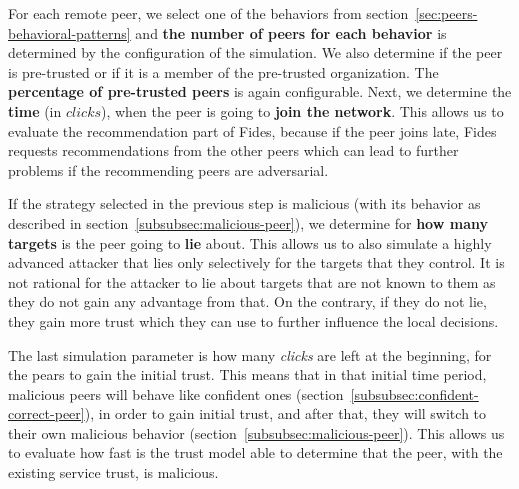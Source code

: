 For each remote peer, we select one of the behaviors from section~\ref{sec:peers-behavioral-patterns} and \textbf{the number of peers for each behavior} is determined by the configuration of the simulation.
We also determine if the peer is pre-trusted or if it is a member of the pre-trusted organization. The \textbf{percentage of pre-trusted peers} is again configurable.
Next, we determine the \textbf{time} (in $clicks$), when the peer is going to \textbf{join the network}. This allows us to evaluate the recommendation part of Fides, because if the peer joins late, Fides requests recommendations from the other peers which can lead to further problems if the recommending peers are adversarial.

If the strategy selected in the previous step is malicious (with its behavior as described in section~\ref{subsubsec:malicious-peer}), we determine for \textbf{how many targets} is the peer going to \textbf{lie} about.
This allows us to also simulate a highly advanced attacker that lies only selectively for the targets that they control.
It is not rational for the attacker to lie about targets that are not known to them as they do not gain any advantage from that. On the contrary, if they do not lie, they gain more trust which they can use to further influence the local decisions. 

The last simulation parameter is how many \textit{clicks} are left at the beginning, for the pears to gain the initial trust.
This means that in that initial time period, malicious peers will behave like confident ones (section~\ref{subsubsec:confident-correct-peer}), in order to gain initial trust, and after that, they will switch to their own malicious behavior (section~\ref{subsubsec:malicious-peer}).
This allows us to evaluate how fast is the trust model able to determine that the peer, with the existing service trust, is malicious.